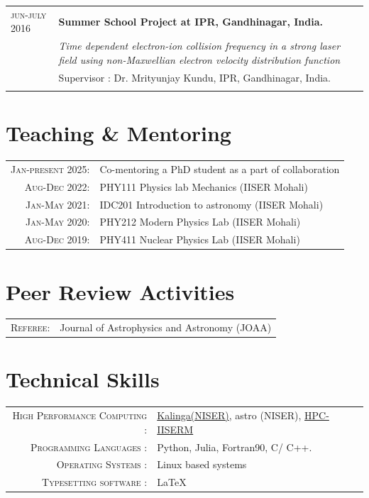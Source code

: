 \documentclass[a4paper,10pt]{article}
\begin{document}
\begin{tabular}{p{2.3cm} p{11cm}}
\textsc{jun-july 2016}  & \textbf{Summer School Project at IPR, Gandhinagar, India.} \\
&\textit{Time dependent electron-ion collision frequency in a
strong laser field using non-Maxwellian electron velocity distribution function}\\
& \footnotesize{Supervisor : Dr. Mrityunjay Kundu, IPR, Gandhinagar, India.}\\
\\
\end{tabular}



\section{Teaching \& Mentoring}
\begin{tabular}{rl}
\textsc{Jan-present 2025:}& Co-mentoring a PhD student as a part of collaboration\\
 \textsc{Aug-Dec 2022:}& PHY111 Physics lab Mechanics (IISER Mohali)\\
 \textsc{Jan-May 2021:}& IDC201 Introduction to astronomy (IISER Mohali)\\
 \textsc{Jan-May 2020:}& PHY212 Modern Physics Lab (IISER Mohali)\\
\textsc{Aug-Dec 2019:}& PHY411 Nuclear Physics Lab (IISER Mohali)\\
\end{tabular}

\section{Peer Review Activities}
\begin{tabular}{rl}
 \textsc{Referee:} & Journal of Astrophysics and Astronomy (JOAA)
\end{tabular}

\section{Technical Skills}
\begin{tabular}{rl}
 \textsc{High Performance Computing : } & \href{https://www.niser.ac.in/hpc}{Kalinga(NISER)}, astro (NISER), \href{https://www.iisermohali.ac.in/hpc-facility/uncategorised/high-performance-computing-facility-at-iiser-mohali}{HPC-IISERM} \\
 \textsc{Programming Languages : } & Python, Julia, Fortran90, C/ C++.\\
 \textsc{Operating Systems : } & Linux based systems\\
 \textsc{Typesetting software : } & \LaTeX
\end{tabular}
\end{document}
